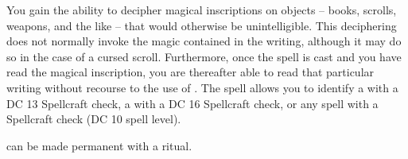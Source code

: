 \spelldur{\durlong}
\begin{spelleffect}
You gain the ability to decipher magical inscriptions on objects -- books, scrolls, weapons, and the like -- that would otherwise be unintelligible. This deciphering does not normally invoke the magic contained in the writing, although it may do so in the case of a cursed scroll. Furthermore, once the spell is cast and you have read the magical inscription, you are thereafter able to read that particular writing without recourse to the use of . The spell allows you to identify a  with a DC 13 Spellcraft check, a  with a DC 16 Spellcraft check, or any  spell with a Spellcraft check (DC 10 \add spell level).
\end{spelleffect}
\begin{spellnotes}
 can be made permanent with a  ritual.
\end{spellnotes}

